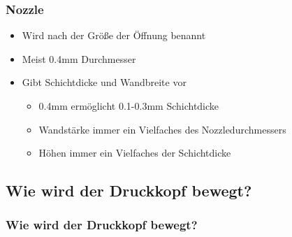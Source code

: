 {
\begin{frame}
  \frametitle{Nozzle}
  \pause
  \begin{itemize}
    \item Wird nach der Größe der Öffnung benannt \pause
    \item Meist 0.4mm Durchmesser \pause
    \item Gibt Schichtdicke und Wandbreite vor \pause
    \begin{itemize}
      \item 0.4mm ermöglicht 0.1-0.3mm Schichtdicke
      \item Wandstärke immer ein Vielfaches des Nozzledurchmessers
      \item Höhen immer ein Vielfaches der Schichtdicke
    \end{itemize}
  \end{itemize}
\end{frame}
}

\subsection{Wie wird der Druckkopf bewegt?}
{
\begin{frame}
  \frametitle{Wie wird der Druckkopf bewegt?}
\end{frame}
}

